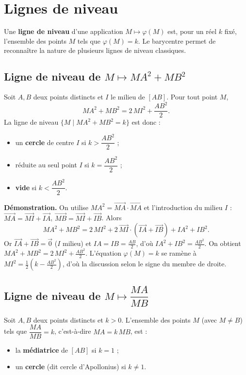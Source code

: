 \section{Lignes de niveau}

Une \textbf{ligne de niveau} d'une application $M\mapsto \varphi(M)$ est, pour un réel
$k$ fixé, l'ensemble des points $M$ tels que $\varphi(M)=k$. Le barycentre permet de
reconnaître la nature de plusieurs lignes de niveau classiques.

\subsection{Ligne de niveau de $M\mapsto MA^2+MB^2$}

\begin{theoreme}[Ensemble $\{M\mid MA^2+MB^2=k\}$]
Soit $A,B$ deux points distincts et $I$ le milieu de $[AB]$. Pour tout point $M$,
\[ MA^2+MB^2=2\,MI^2+\frac{AB^2}{2}. \]
La ligne de niveau $\{M\mid MA^2+MB^2=k\}$ est donc :
\begin{itemize}
  \item un \textbf{cercle} de centre $I$ si $k>\dfrac{AB^2}{2}$ ;
  \item réduite au seul point $I$ si $k=\dfrac{AB^2}{2}$ ;
  \item \textbf{vide} si $k<\dfrac{AB^2}{2}$.
\end{itemize}
\end{theoreme}

\begin{remarque}
\textbf{Démonstration.} On utilise $MA^2=\vec{MA}\cdot\vec{MA}$ et l'introduction du
milieu $I$ : $\vec{MA}=\vec{MI}+\vec{IA}$, $\vec{MB}=\vec{MI}+\vec{IB}$. Alors
\[ MA^2+MB^2=2\,MI^2+2\,\vec{MI}\cdot(\vec{IA}+\vec{IB})+IA^2+IB^2. \]
Or $\vec{IA}+\vec{IB}=\vec{0}$ ($I$ milieu) et $IA=IB=\tfrac{AB}{2}$, d'où
$IA^2+IB^2=\tfrac{AB^2}{2}$. On obtient $MA^2+MB^2=2\,MI^2+\tfrac{AB^2}{2}$. L'équation
$\varphi(M)=k$ se ramène à $MI^2=\tfrac12\!\left(k-\tfrac{AB^2}{2}\right)$, d'où la
discussion selon le signe du membre de droite.
\end{remarque}

\subsection{Ligne de niveau de $M\mapsto \dfrac{MA}{MB}$}

\begin{theoreme}[Ensemble $\big\{M\mid \tfrac{MA}{MB}=k\big\}$]
Soit $A,B$ deux points distincts et $k>0$. L'ensemble des points $M$ (avec $M\neq B$)
tels que $\dfrac{MA}{MB}=k$, c'est-à-dire $MA=k\,MB$, est :
\begin{itemize}
  \item la \textbf{médiatrice} de $[AB]$ si $k=1$ ;
  \item un \textbf{cercle} (dit cercle d'Apollonius) si $k\neq 1$.
\end{itemize}
\end{theoreme}

